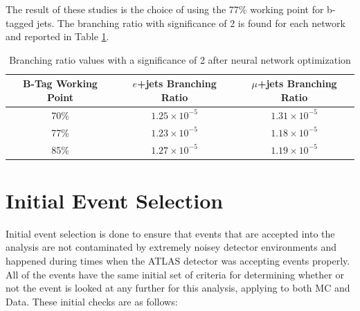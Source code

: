 The result of these studies is the choice of using the 77\% working point for b-tagged jets.  The branching ratio with significance of 2 is found for each network and reported in Table \ref{tab:BRsAfterNN}.

\begin{table}[]
\begin{center}
{\renewcommand{\arraystretch}{1.2}
\begin{tabular}{ccc}
\hline
B-Tag Working Point  &  $e$+jets Branching Ratio   & $\mu$+jets Branching Ratio  \\  \hline 
70\%            &  $1.25\times10^{-5}$  &  $1.31\times10^{-5}$\\
77\%           &   $1.23\times10^{-5}$ &   $1.18\times10^{-5}$	\\  
85\%            &  $1.27\times10^{-5}$ &   $1.19\times10^{-5}$	\\ \hline
\end{tabular}
\caption{Branching ratio values with a significance of 2 after neural network optimization}
\label{tab:BRsAfterNN}
}
\end{center}
\end{table}





\section{Initial Event Selection}

Initial event selection is done to ensure that events that are accepted into the analysis are not contaminated by extremely noisey detector environments and happened during times when the ATLAS detector was accepting events properly.  All of the events  have the same initial set of criteria for determining whether or not the event is looked at any further for this analysis, applying to both MC and Data.  These initial checks are as follows:

